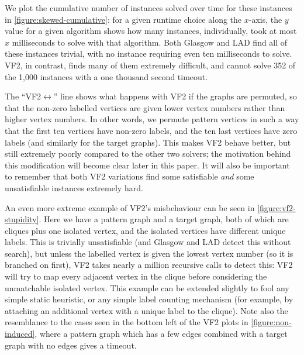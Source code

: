 \documentclass[twoside,11pt]{article}
\begin{document}
We plot the cumulative number of instances solved over time for these instances in
\cref{figure:skewed-cumulative}: for a given runtime choice along the $x$-axis, the $y$ value for a
given algorithm shows how many instances, individually, took at most $x$ milliseconds to solve with
that algorithm. Both Glasgow and LAD find all of these instances trivial, with no instance requiring
even ten milliseconds to solve. VF2, in contrast, finds many of them extremely difficult, and cannot
solve 352 of the 1,000 instances with a one thousand second timeout.

The ``VF2${\leftrightarrow}$'' line shows what happens with VF2 if the graphs are permuted, so that
the non-zero labelled vertices are given lower vertex numbers rather than higher vertex numbers.
In other words, we permute pattern vertices in such a way that the first ten vertices have non-zero
labels, and the ten last vertices have zero labels (and similarly for the target graphs).
This makes VF2 behave better, but still extremely poorly compared to the other two solvers; the
motivation behind this modification will become clear later in this paper.  It will also be
important to remember that both VF2 variations find some satisfiable \emph{and} some unsatisfiable
instances extremely hard.

An even more extreme example of VF2's misbehaviour can be seen in \cref{figure:vf2-stupidity}. Here
we have a pattern graph and a target graph, both of which are cliques plus one isolated vertex, and
the isolated vertices have different unique labels. This is trivially unsatisfiable (and Glasgow and
LAD detect this without search), but unless the labelled vertex is given the lowest vertex number
(so it is branched on first), VF2 takes nearly a million recursive calls to detect this: VF2 will
try to map every adjacent vertex in the clique before considering the unmatchable isolated vertex.
This example can be extended slightly to fool any simple static heuristic, or any simple label
counting mechanism (for example, by attaching an additional vertex with a unique label to the
clique). Note also the resemblance to the cases seen in the bottom left of the VF2 plots in
\cref{figure:non-induced}, where a pattern graph which has a few edges combined with a target graph
with no edges gives a timeout.
\end{document}
